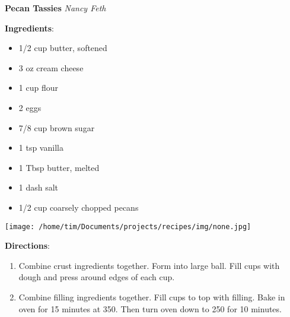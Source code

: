 \documentclass[11pt, twoside, openany]{book}
\begin{document}
\noindent\begin{minipage}[t]{\linewidth}%
{\Large\textbf{Pecan Tassies}} \label{pecan-tassies}\hfill\textit{Nancy Feth}\\
\noindent\begin{minipage}[t]{0.78\linewidth}%
\textbf{Ingredients}:\vspace{-3mm}
\begin{multicols}{2}
\begin{itemize}\setlength\itemsep{-1mm}
\item 1/2 cup butter, softened
\item 3 oz cream cheese
\item 1 cup flour
\item 2 eggs
\item 7/8 cup brown sugar
\item 1 tsp vanilla
\item 1 Tbsp butter, melted
\item 1 dash salt
\item 1/2 cup coarsely chopped pecans
\end{itemize}
\end{multicols}
\end{minipage}
\noindent\begin{minipage}[t]{0.18\linewidth}
\centering \strut\vspace*{-\baselineskip}\newline
\texttt{[image: /home/tim/Documents/projects/recipes/img/none.jpg]}\\
\end{minipage}\vspace{3mm}
\textbf{Directions}:
\vspace{-3mm}\begin{enumerate}\setlength\itemsep{-1mm}
\item Combine crust ingredients together. Form into large ball. Fill cups with dough and press around edges of each cup.
\item Combine filling ingredients together. Fill cups to top with filling. Bake in oven for 15 minutes at 350. Then turn oven down to 250 for 10 minutes. 
\end{enumerate}
\end{minipage}\vspace{8mm}
\end{document}
